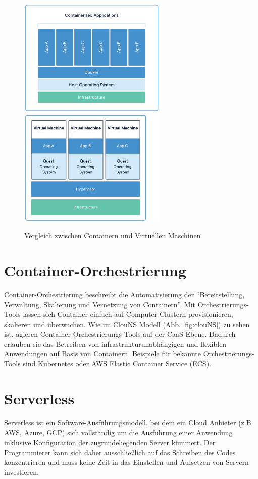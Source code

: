 \begin{figure}[H]
    \includegraphics[width=200pt]{img/container-architecture.png}
    \includegraphics[width=200pt]{img/vm-architecture.png}
    
    \caption[Vergleich zwischen Containern und Virtuellen Maschinen]{Vergleich zwischen Containern und Virtuellen Maschinen\cite{noauthor_what_nodate}}
    \label{fig:containerVsVMs}
\end{figure}

\section{Container-Orchestrierung}
Container-Orchestrierung beschreibt die Automatisierung der "`Bereitstellung, Verwaltung, Skalierung und Vernetzung von Containern"'\cite{noauthor_was_nodate-1}. Mit Orchestrierungs-Tools lassen sich Container einfach auf Computer-Clustern provisionieren, skalieren und überwachen. Wie im ClouNS Modell (Abb. \ref{fig:clouNS}) zu sehen ist, agieren Container Orchestrierungs Tools auf der CaaS Ebene. Dadurch erlauben sie das Betreiben von infrastrukturunabhängigen und flexiblen Anwendungen auf Basis von Containern\cite{noauthor_was_nodate}. Beispiele für bekannte Orchestrierungs-Tools sind Kubernetes oder AWS Elastic Container Service (ECS).

\section{Serverless}
Serverless ist ein Software-Ausführungsmodell, bei dem ein Cloud Anbieter (z.B AWS, Azure, GCP) sich vollständig um die Ausführung einer Anwendung inklusive Konfiguration der zugrundeliegenden Server kümmert. Der Programmierer kann sich daher ausschließlich auf das Schreiben des Codes konzentrieren und muss keine Zeit in das Einstellen und Aufsetzen von Servern investieren.

